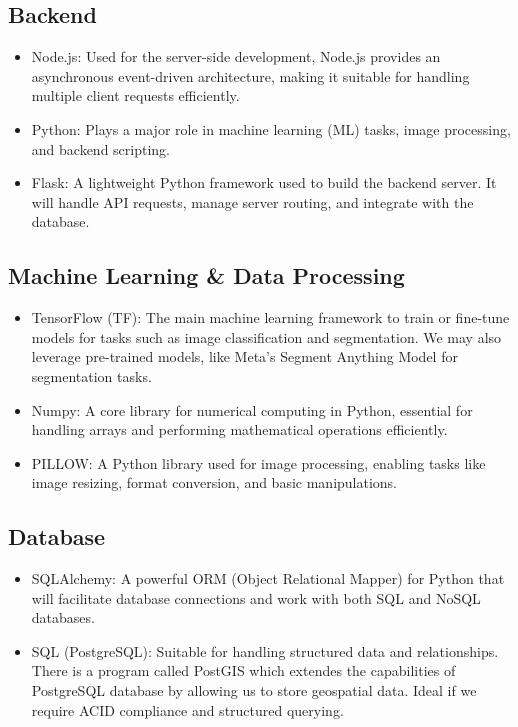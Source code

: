 \documentclass{article}
\begin{document}
  \subsection{Backend}
  \begin{itemize}
      \item Node.js: Used for the server-side development, Node.js provides an asynchronous event-driven architecture, making it suitable for handling multiple client requests efficiently.
      \item Python: Plays a major role in machine learning (ML) tasks, image processing, and backend scripting.
      \item Flask: A lightweight Python framework used to build the backend server. It will handle API requests, manage server routing, and integrate with the database.
  \end{itemize}
  
  \subsection{Machine Learning \& Data Processing}
  \begin{itemize}
      \item TensorFlow (TF): The main machine learning framework to train or fine-tune models for tasks such as image classification and segmentation. We may also leverage pre-trained models, like Meta’s Segment Anything Model for segmentation tasks.
      \item Numpy: A core library for numerical computing in Python, essential for handling arrays and performing mathematical operations efficiently.
      \item PILLOW: A Python library used for image processing, enabling tasks like image resizing, format conversion, and basic manipulations.
  \end{itemize}
  
  \subsection{Database}
  \begin{itemize}
      \item SQLAlchemy: A powerful ORM (Object Relational Mapper) for Python that will facilitate database connections and work with both SQL and NoSQL databases.
      \item SQL (PostgreSQL): Suitable for handling structured data and relationships. There is a program called PostGIS which extendes the capabilities of PostgreSQL database by allowing us to store geospatial data. Ideal if we require ACID compliance and structured querying.
  \end{itemize}
  
\end{document}
